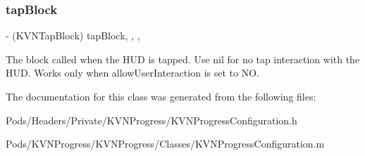 \subsubsection{\texorpdfstring{tap\+Block}{tapBlock}}
{\footnotesize\ttfamily -\/ (K\+V\+N\+Tap\+Block) tap\+Block\hspace{0.3cm}{\ttfamily [read]}, {\ttfamily [write]}, {\ttfamily [nonatomic]}, {\ttfamily [copy]}}

The block called when the H\+UD is tapped. Use {\ttfamily nil} for no tap interaction with the H\+UD. Works only when {\ttfamily allow\+User\+Interaction} is set to {\ttfamily NO}. 

The documentation for this class was generated from the following files\+:\begin{DoxyCompactItemize}
\item 
Pods/\+Headers/\+Private/\+K\+V\+N\+Progress/K\+V\+N\+Progress\+Configuration.\+h\item 
Pods/\+K\+V\+N\+Progress/\+K\+V\+N\+Progress/\+Classes/K\+V\+N\+Progress\+Configuration.\+m\end{DoxyCompactItemize}
